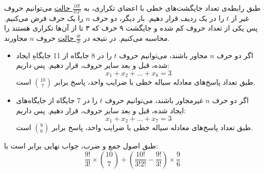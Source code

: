 \p
طبق رابطه‌ی تعداد جایگشت‌های خطی با اعضای تکراری،
به
\underline{$\frac{10!}{3!2!}$ حالت}
 می‌توانیم حروف غیر از 
$t$ را در یک ردیف قرار دهیم.
بار دیگر، دو حرف
$n$ 
را یک حرف فرض می‌کنیم. پس یکی از تعداد حروف کم شده و جایگشت ۹ حرف که ۳ تا از آن‌ها تکراری هستند را 
محاسبه می‌کنیم.
در نتیجه در 
\underline{$\frac{9!}{3!}$ حالت} 
 حروف 
$n$ مجاورند.
\begin{itemize}
\item 
اگر دو حرف
 $n$ 
 مجاور باشند، می‌توانیم حروف 
 $t$
 را در 8 جایگاه‌ از 11 جایگاه‌ِ ایجاد شده، قبل و بعد سایر حروف، قرار دهیم. پس داریم:
$$x_1 + x_2 + \ldots + x_8 = 3$$
طبق تعداد پاسخ‌های معادله سیاله خطی با ضرایب واحد،
پاسخ برابر
 \underline{$\binom{10}{7}$}
است.

\item 
اگر دو حرف
$n$ 
غیرمجاور باشند، می‌توانیم حروف
$t$ 
را در 7 جایگاه‌ از جایگاه‌های ایجاد شده، قبل و بعد سایر حروف، قرار دهیم. پس داریم:
$$x_1 + x_2 + \ldots + x_7 = 3$$
طبق تعداد پاسخ‌های معادله سیاله خطی با ضرایب واحد،
پاسخ برابر 
\underline{$\binom{9}{6}$}
است.
\end{itemize}

\p
طبق اصول جمع و ضرب، جواب نهایی برابر است با:
$$\frac{9!}{3!}\times\binom{10}{7} + (\frac{10!}{3!2!} - \frac{9!}{3!})\times\frac{9}{6}$$